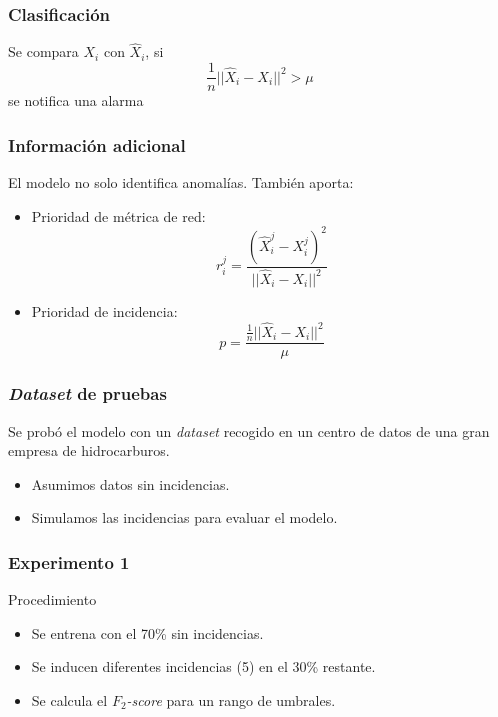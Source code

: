 \documentclass{beamer}
\begin{document}
\begin{frame}
\frametitle{Clasificación}

Se compara $X_i$ con $\hat{X}_i$, si 
\[
\frac{1}{n}|| \hat{X}_i - X_i ||^2 > \mu
\]
se notifica una alarma
 
\end{frame}


\begin{frame}
\frametitle{Información adicional}
El modelo no solo identifica anomalías. También aporta:
\begin{itemize}
\item Prioridad de métrica de red:
\[
	r_i^j = \frac{(\hat{X}_i^j - X_i^j)^2}{||\hat{X}_i - X_i ||^2}
\]
\item Prioridad de incidencia:
\[
	p = \frac{\frac{1}{n}||\hat{X}_i - X_i||^2}{\mu}
\]
\end{itemize}
\end{frame}



\begin{frame}
\frametitle{\textit{Dataset} de pruebas}

Se probó el modelo con un \textit{dataset} recogido en un centro de datos de una gran empresa de hidrocarburos.
\begin{itemize}
\item Asumimos datos sin incidencias.
\item Simulamos las incidencias para evaluar el modelo.
\end{itemize}
\end{frame}

\begin{frame}
\frametitle{Experimento 1}
\begin{block}{Procedimiento}
\begin{itemize}
\item Se entrena con el 70\% sin incidencias.
\item Se inducen diferentes incidencias (5) en el 30\% restante.
\item Se calcula el $F_2$\textit{-score} para un rango de umbrales.
\end{itemize}
\end{block}
\end{frame}
\end{document}
